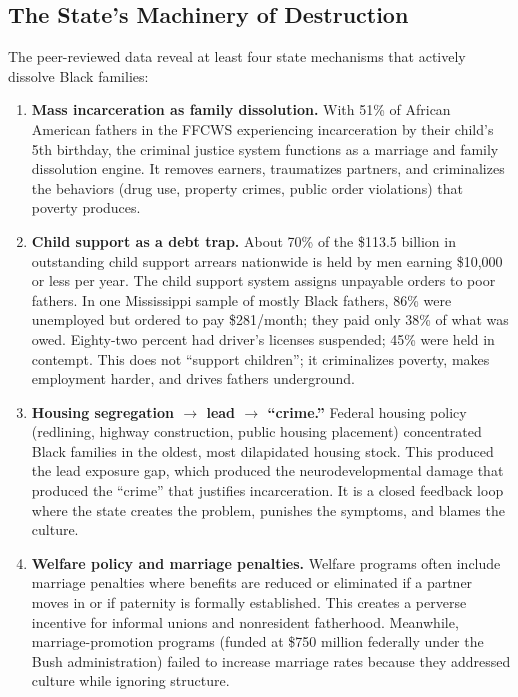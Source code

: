\subsection{The State's Machinery of Destruction}

The peer-reviewed data reveal at least four state mechanisms that actively dissolve Black families:

\begin{enumerate}
  \item \textbf{Mass incarceration as family dissolution.} With 51\% of African American fathers in the FFCWS experiencing incarceration by their child's 5th birthday, the criminal justice system functions as a marriage and family dissolution engine. It removes earners, traumatizes partners, and criminalizes the behaviors (drug use, property crimes, public order violations) that poverty produces.
  
  \item \textbf{Child support as a debt trap.} About 70\% of the \$113.5 billion in outstanding child support arrears nationwide is held by men earning \$10,000 or less per year. The child support system assigns unpayable orders to poor fathers. In one Mississippi sample of mostly Black fathers, 86\% were unemployed but ordered to pay \$281/month; they paid only 38\% of what was owed. Eighty-two percent had driver's licenses suspended; 45\% were held in contempt. This does not ``support children''; it criminalizes poverty, makes employment harder, and drives fathers underground.
  
  \item \textbf{Housing segregation $\rightarrow$ lead $\rightarrow$ ``crime.''} Federal housing policy (redlining, highway construction, public housing placement) concentrated Black families in the oldest, most dilapidated housing stock. This produced the lead exposure gap, which produced the neurodevelopmental damage that produced the ``crime'' that justifies incarceration. It is a closed feedback loop where the state creates the problem, punishes the symptoms, and blames the culture.
  
  \item \textbf{Welfare policy and marriage penalties.} Welfare programs often include marriage penalties where benefits are reduced or eliminated if a partner moves in or if paternity is formally established. This creates a perverse incentive for informal unions and nonresident fatherhood. Meanwhile, marriage-promotion programs (funded at \$750 million federally under the Bush administration) failed to increase marriage rates because they addressed culture while ignoring structure.
\end{enumerate}


